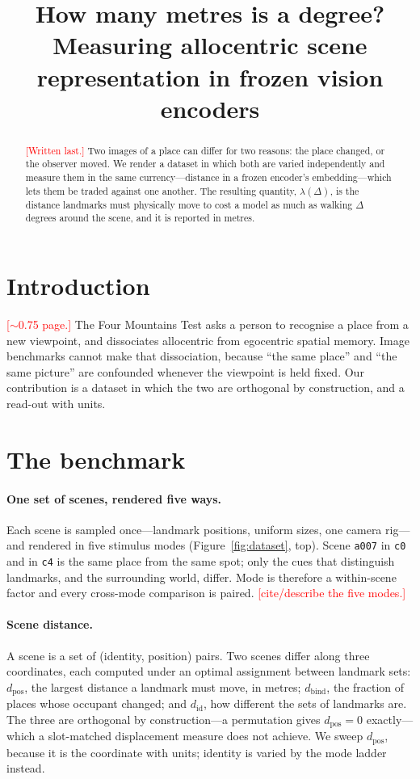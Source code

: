\documentclass{article}
\title{How many metres is a degree? Measuring allocentric scene
representation in frozen vision encoders}
\author{%
  \TODO{authors}
}
\newcommand{\TODO}[1]{\textcolor{red}{[#1]}}
\newcommand{\dpos}{d_{\mathrm{pos}}}
\newcommand{\dbind}{d_{\mathrm{bind}}}
\newcommand{\did}{d_{\mathrm{id}}}
\begin{document}
\maketitle

\begin{abstract}
\TODO{Written last.} Two images of a place can differ for two reasons: the place
changed, or the observer moved. We render a dataset in which both are varied
independently and measure them in the same currency---distance in a frozen
encoder's embedding---which lets them be traded against one another. The
resulting quantity, $\lambda(\Delta)$, is the distance landmarks must physically
move to cost a model as much as walking $\Delta$ degrees around the scene, and it
is reported in metres.
\end{abstract}

\section{Introduction}
\label{sec:intro}

\TODO{$\sim$0.75 page.} The Four Mountains Test asks a person to recognise a
place from a new viewpoint, and dissociates allocentric from egocentric spatial
memory. Image benchmarks cannot make that dissociation, because ``the same
place'' and ``the same picture'' are confounded whenever the viewpoint is held
fixed. Our contribution is a dataset in which the two are orthogonal by
construction, and a read-out with units.

\section{The benchmark}
\label{sec:benchmark}

\paragraph{One set of scenes, rendered five ways.}
Each scene is sampled once---landmark positions, uniform sizes, one camera
rig---and rendered in five stimulus modes (Figure~\ref{fig:dataset}, top).
Scene \texttt{a007} in \texttt{c0} and in \texttt{c4} is the same place from the
same spot; only the cues that distinguish landmarks, and the surrounding world,
differ. Mode is therefore a within-scene factor and every cross-mode comparison
is paired. \TODO{cite/describe the five modes.}

\paragraph{Scene distance.}
A scene is a set of (identity, position) pairs. Two scenes differ along three
coordinates, each computed under an optimal assignment between landmark sets:
$\dpos$, the largest distance a landmark must move, in metres; $\dbind$, the
fraction of places whose occupant changed; and $\did$, how different the sets of
landmarks are. The three are orthogonal by construction---a permutation gives
$\dpos = 0$ exactly---which a slot-matched displacement measure does not
achieve. We sweep $\dpos$, because it is the coordinate with units; identity is
varied by the mode ladder instead.
\end{document}
